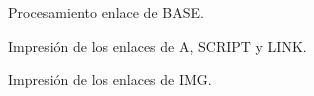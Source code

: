 \documentclass[10pt, a4paper,spanish]{article}
\begin{document}
\begin{figure}[H]
  \centering
  \caption{Procesamiento enlace de BASE.}
\end{figure}

\begin{figure}[H]
  \centering
  \caption{Impresión de los enlaces de A, SCRIPT y LINK.}
\end{figure}

\begin{figure}[H]
  \centering
  \caption{Impresión de los enlaces de IMG.}
\end{figure}
\end{document}
